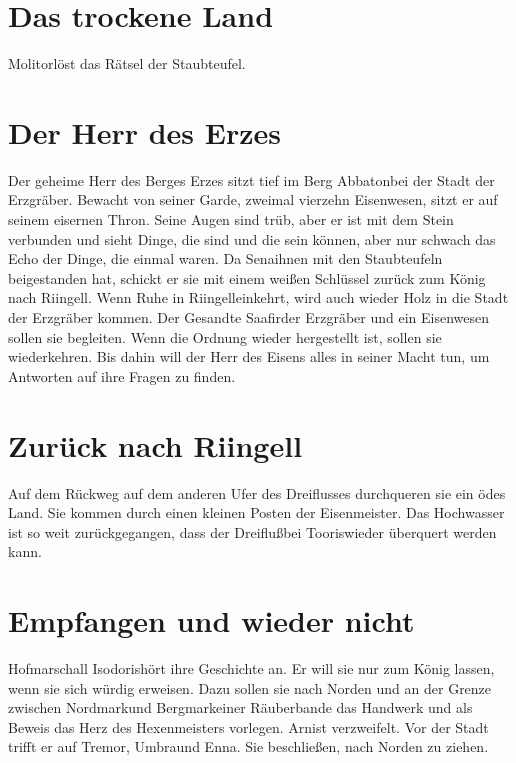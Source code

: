 \documentclass[12pt,a4paper,onecolumn,twoside,ngerman]{book}
\newcommand{\Molitor}{Molitor}
\newcommand{\Sena}{Sena}
\newcommand{\Umbra}{Umbra}
\newcommand{\Enna}{Enna}
\newcommand{\Tremor}{Tremor}
\newcommand{\Nordmark}{Nordmark}
\newcommand{\Bergmark}{Bergmark}
\newcommand{\Arn}{Arn}
\newcommand{\Rhingell}{Riingell}
\newcommand{\Isodoris}{Isodoris}
\newcommand{\Dreifluss}{Dreifluß}
\newcommand{\Toris}{Tooris}
\newcommand{\Eisenmeister}{Eisenmeister}
\newcommand{\Abaton}{Abbaton}
\newcommand{\Safir}{Saafir}
\newcommand{\Staubteufel}{Staubteufel}
\begin{document}
\section{Das trockene Land}
\Molitor löst das Rätsel der \Staubteufel .

\section{Der Herr des Erzes}
Der geheime Herr des Berges Erzes sitzt tief im Berg \Abaton bei der Stadt der Erzgräber. Bewacht von seiner Garde, zweimal vierzehn Eisenwesen, sitzt er auf seinem eisernen Thron. Seine Augen sind trüb, aber er ist mit dem Stein verbunden und sieht Dinge, die sind und die sein können, aber nur schwach das Echo der Dinge, die einmal waren. 
Da \Sena ihnen mit den Staubteufeln beigestanden hat, schickt er sie mit einem weißen Schlüssel zurück zum König nach \Rhingell . Wenn Ruhe in \Rhingell einkehrt, wird auch wieder Holz in die Stadt der Erzgräber kommen. Der Gesandte \Safir der Erzgräber und ein Eisenwesen sollen sie begleiten. Wenn die Ordnung wieder hergestellt ist, sollen sie wiederkehren. Bis dahin will der Herr des Eisens alles in seiner Macht tun, um Antworten auf ihre Fragen zu finden.

\section{Zurück nach \Rhingell}
Auf dem Rückweg auf dem anderen Ufer des Dreiflusses durchqueren sie ein ödes Land. Sie kommen durch einen kleinen Posten der \Eisenmeister. 
Das Hochwasser ist so weit zurückgegangen, dass der \Dreifluss bei \Toris wieder überquert werden kann.


\section{Empfangen und wieder nicht}
Hofmarschall \Isodoris hört ihre Geschichte an. Er will sie nur zum König lassen, wenn sie sich würdig erweisen. Dazu sollen sie nach Norden und an der Grenze zwischen \Nordmark und \Bergmark einer Räuberbande das Handwerk und als Beweis das Herz des Hexenmeisters vorlegen. \Arn ist verzweifelt. Vor der Stadt trifft er auf \Tremor , \Umbra und \Enna . Sie beschließen, nach Norden zu ziehen.
\end{document}
